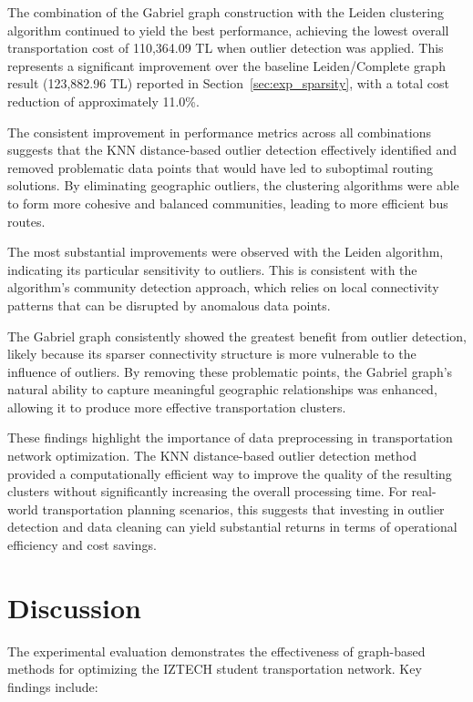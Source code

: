 The combination of the Gabriel graph construction with the Leiden clustering algorithm continued to yield the best performance, achieving the lowest overall transportation cost of 110,364.09 TL when outlier detection was applied. This represents a significant improvement over the baseline Leiden/Complete graph result (123,882.96 TL) reported in Section~\ref{sec:exp_sparsity}, with a total cost reduction of approximately 11.0\%.


The consistent improvement in performance metrics across all combinations suggests that the KNN distance-based outlier detection effectively identified and removed problematic data points that would have led to suboptimal routing solutions. By eliminating geographic outliers, the clustering algorithms were able to form more cohesive and balanced communities, leading to more efficient bus routes.

The most substantial improvements were observed with the Leiden algorithm, indicating its particular sensitivity to outliers. This is consistent with the algorithm's community detection approach, which relies on local connectivity patterns that can be disrupted by anomalous data points.

The Gabriel graph consistently showed the greatest benefit from outlier detection, likely because its sparser connectivity structure is more vulnerable to the influence of outliers. By removing these problematic points, the Gabriel graph's natural ability to capture meaningful geographic relationships was enhanced, allowing it to produce more effective transportation clusters.

These findings highlight the importance of data preprocessing in transportation network optimization. The KNN distance-based outlier detection method provided a computationally efficient way to improve the quality of the resulting clusters without significantly increasing the overall processing time. For real-world transportation planning scenarios, this suggests that investing in outlier detection and data cleaning can yield substantial returns in terms of operational efficiency and cost savings.

\section{Discussion}
\label{sec:discussion}

The experimental evaluation demonstrates the effectiveness of graph-based methods for optimizing the IZTECH student transportation network. Key findings include:


